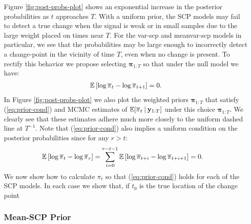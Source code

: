 Figure \ref{fig:post-probs-plot} shows an exponential increase in the posterior probabilities as $t$ approaches $T$. With a uniform prior, the SCP models may fail to detect a true change when the signal is weak or in small samples due to the large weight placed on times near $T$. For the var-scp and meanvar-scp models in particular, we see that the probabilities may be large enough to incorrectly detect a change-point in the vicinity of time $T$, even when no change is present. To rectify this behavior we propose selecting $\boldsymbol{\pi}_{1:T}$ so that under the null model we have:
\begin{align}\label{eq:prior-cond}
    \mathbb{E}\left[\log\overline{\pi}_t - \log \overline{\pi}_{t+1} \right] = 0.
\end{align}
In Figure \ref{fig:post-probs-plot} we also plot the weighted priors $\boldsymbol{\pi}_{1:T}$ that satisfy (\ref{eq:prior-cond}) and MCMC estimates of $\mathbb{E}[\overline{\pi}_{t} \:|\: \mathbf{y}_{1:T}]$ under this choice $\boldsymbol{\pi}_{1:T}$. We clearly see that these estimates adhere much more closely to the uniform dashed line at $T^{-1}$. Note that (\ref{eq:prior-cond}) also implies a uniform condition on the posterior probabilities since for any $r > t$:
\begin{align*}
    \mathbb{E}\left[\log\overline{\pi}_t - \log \overline{\pi}_r \right] &= \sum_{i=0}^{r-t-1} \mathbb{E}\left[\log\overline{\pi}_{t+i} - \log \overline{\pi}_{t+i+1} \right] = 0.
\end{align*}
We now show how to calculate $\pi_t$ so that (\ref{eq:prior-cond}) holds for each of the SCP models. In each case we show that, if $t_0$ is the true location of the change point

\subsubsection{Mean-SCP Prior}

